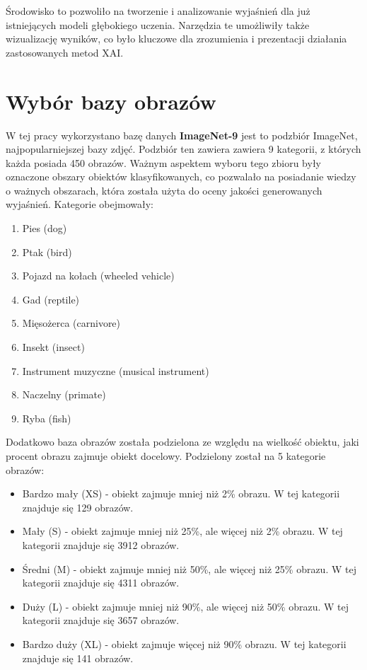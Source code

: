 Środowisko to pozwoliło na tworzenie i analizowanie wyjaśnień dla już istniejących modeli głębokiego uczenia.
Narzędzia te umożliwiły także wizualizację wyników, co było kluczowe dla zrozumienia i prezentacji działania zastosowanych metod XAI.

\section*{Wybór bazy obrazów}

W tej pracy wykorzystano bazę danych \textbf{ImageNet-9}\cite{imagenet} jest to podzbiór ImageNet, najpopularniejszej bazy zdjęć.
Podzbiór ten zawiera zawiera 9 kategorii, z których każda posiada 450 obrazów.
Ważnym aspektem wyboru tego zbioru były oznaczone obszary obiektów klasyfikowanych, co pozwalało na posiadanie wiedzy o ważnych obszarach, która została użyta do oceny jakości generowanych wyjaśnień.
Kategorie obejmowały:
\begin{enumerate}
	\item Pies (dog)
	\item Ptak (bird)
	\item Pojazd na kołach (wheeled vehicle)
	\item Gad (reptile)
	\item Mięsożerca (carnivore)
	\item Insekt (insect)
	\item Instrument muzyczne (musical instrument)
	\item Naczelny (primate)
	\item Ryba (fish)
\end{enumerate}

Dodatkowo baza obrazów została podzielona ze względu na wielkość obiektu, jaki procent obrazu zajmuje obiekt docelowy.
Podzielony został na 5 kategorie obrazów:
\begin{itemize}
	\item Bardzo mały (XS) - obiekt zajmuje mniej niż 2\% obrazu. W tej kategorii znajduje się 129 obrazów.
	\item Mały (S) - obiekt zajmuje mniej niż 25\%, ale więcej niż 2\% obrazu. W tej kategorii znajduje się 3912 obrazów.
	\item Średni (M) - obiekt zajmuje mniej niż 50\%, ale więcej niż 25\% obrazu. W tej kategorii znajduje się 4311 obrazów.
	\item Duży (L) - obiekt zajmuje mniej niż 90\%, ale więcej niż 50\% obrazu. W tej kategorii znajduje się 3657 obrazów.
	\item Bardzo duży (XL) - obiekt zajmuje więcej niż 90\% obrazu. W tej kategorii znajduje się 141 obrazów.
\end{itemize}

